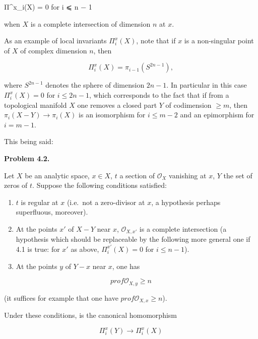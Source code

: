 \documentclass[
  11pt,
  a4paper,
]{book}
\newenvironment{Shaded}{}{}
\newcommand{\NormalTok}[1]{#1}
\begin{document}
\begin{Shaded}
\begin{Highlighting}[]
\NormalTok{Π\^{}x\_i(X) = 0   for i ⩽ n − 1}
\end{Highlighting}
\end{Shaded}

when \(X\) is a complete intersection of dimension \(n\) at \(x\).

As an example of local invariants \(\Pi^{x}_{i}(X)\), note that if \(x\)
is a non-singular point of \(X\) of complex dimension \(n\), then

\[ \Pi^{x}_{i}(X) = \pi_{i-1}(S^{2n-1}), \]

where \(S^{2n-1}\) denotes the sphere of dimension \(2n - 1\). In
particular in this case \(\Pi^{x}_{i}(X) = 0\) for \(i
\leqslant 2n - 1\), which corresponds to the fact that if from a
topological manifold \(X\) one removes a closed part \(Y\) of
codimension \(\geqslant m\), then \(\pi_{i}(X - Y) \to \pi_{i}(X)\) is
an isomorphism for \(i \leqslant m - 2\) and an epimorphism for
\(i = m - 1\).

This being said:

\textbf{Problem 4.2.}

Let \(X\) be an analytic space, \(x \in X\), \(t\) a section of
\(\mathcal{O}_{X}\) vanishing at \(x\), \(Y\) the set of zeros of \(t\).
Suppose the following conditions satisfied:

\begin{enumerate}
\def\labelenumi{\alph{enumi})}
\item
  \(t\) is regular at \(x\) (i.e.~not a zero-divisor at \(x\), a
  hypothesis perhaps superfluous, moreover).
\item
  At the points \(x'\) of \(X - Y\) near \(x\), \(\mathcal{O}_{X,x'}\)
  is a complete intersection (a hypothesis which should be replaceable
  by the following more general one if 4.1 is true: for \(x'\) as above,
  \(\Pi^{x'}_{i}(X) = 0\) for \(i \leqslant
  n - 1\)).
\item
  At the points \(y\) of \(Y - {x}\) near \(x\), one has
\end{enumerate}

\[ prof \mathcal{O}_{X,y} \geqslant n \]

(it suffices for example that one have
\(prof \mathcal{O}_{X,x} \geqslant n\)).

Under these conditions, is the canonical homomorphism

\[ \Pi^{x}_{i}(Y) \to \Pi^{x}_{i}(X) \]
\end{document}
